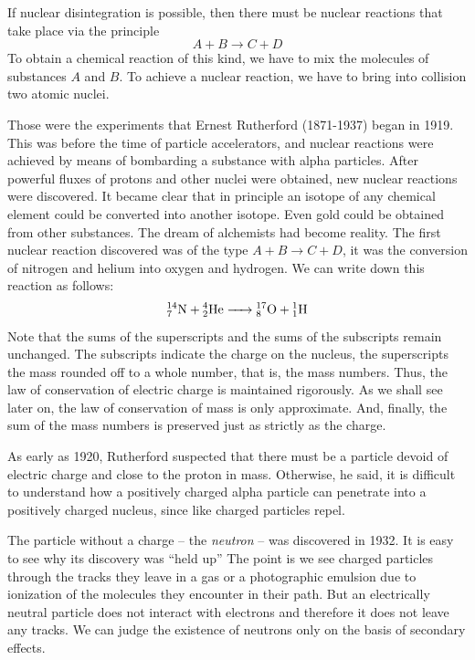 If nuclear disintegration is possible, then there must be nuclear reactions that take place via the principle
\begin{equation*}%
A+B \to C+D
\end{equation*}
To obtain a chemical reaction of this kind, we have to mix the molecules of substances $A$ and $B$. To achieve a nuclear reaction, we have to bring into collision two atomic nuclei.

Those were the experiments that Ernest Rutherford (1871-1937) began in 1919. This was before the time of particle accelerators, and nuclear reactions were achieved by means of bombarding a substance with alpha parti­cles. After powerful fluxes of protons and other nuclei were obtained, new nuclear reactions were discovered. It became clear that in principle an isotope of any chemi­cal element could be converted into another isotope. Even gold could be obtained from other substances. The dream of alchemists had become reality. The first nuclear reaction discovered was of the type $A+B \to C+D$, it was the conversion of nitrogen and helium into oxygen and hydrogen. We can write down this reaction as follows:
\begin{equation*}%
\ce{{^{14}_{7}N} + {^{4}_{2}He} -> {^{17}_{8}O} + {^{1}_{1}H}}
\end{equation*}
Note that the sums of the superscripts and the sums of the subscripts remain unchanged. The subscripts indicate the charge on the nucleus, the superscripts the mass rounded off to a whole number, that is, the mass numbers. Thus, the law of conservation of electric charge is main­tained rigorously. As we shall see later on, the law of conservation of mass is only approximate. And, finally, the sum of the mass numbers is preserved just as strictly as the charge.

As early as 1920, Rutherford suspected that there must be a particle devoid of electric charge and close to the proton in mass. Otherwise, he said, it is difficult to understand how a positively charged alpha particle can penetrate into a positively charged nucleus, since like charged particles repel.

The particle without a charge -- the \emph{neutron} -- was dis­covered in 1932. It is easy to see why its discovery was ``held up'' The point is we see charged particles through the tracks they leave in a gas or a photographic emulsion due to ionization of the molecules they encounter in their path. But an electrically neutral particle does not interact with electrons and therefore it does not leave any tracks. We can judge the existence of neutrons only on the basis of secondary effects.

